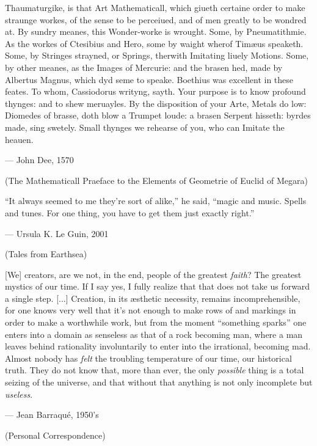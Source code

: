 
Thaumaturgike, is that Art Mathematicall, which giueth certaine order to make straunge workes, of the sense to be perceiued, and of men greatly to be wondred at. By sundry meanes, this Wonder-worke is wrought. Some, by Pneumatithmie. As the workes of Ctesibius and Hero, some by waight wherof Timæus speaketh. Some, by Stringes strayned, or Springs, therwith Imitating liuely Motions. Some, by other meanes, as the Images of Mercurie: and the brasen hed, made by Albertus Magnus, which dyd seme to speake. Boethius was excellent in these feates. To whom, Cassiodorus writyng, sayth. Your purpose is to know profound thynges: and to shew meruayles. By the disposition of your Arte, Metals do low: Diomedes of brasse, doth blow a Trumpet loude: a brasen Serpent hisseth: byrdes made, sing swetely. Small thynges we rehearse of you, who can Imitate the heauen.

\phantom{text} \hfill — John Dee, 1570

(The Mathematicall Praeface to the Elements of Geometrie of Euclid of Megara)

\vspace{2cm}

``It always seemed to me they’re sort of alike,'' he said, ``magic and music.
Spells and tunes. For one thing, you have to get them just exactly right.''

\phantom{text} \hfill — Ursula K. Le Guin, 2001

\phantom{text} \hfill (Tales from Earthsea)

\vspace{2cm}

[We] creators, are we not, in the end, people of the greatest \emph{faith}? The greatest mystics of our time. If I say yes, I fully realize that that does not take us forward a single step. [...] Creation, in its æsthetic necessity, remains incomprehensible, for one knows very well that it's not enough to make rows of  and  markings in order to make a worthwhile work, but from the moment ``something sparks'' one enters into a domain as senseless as that of a rock becoming man, where a man leaves behind rationality involuntarily to enter into the irrational, becoming mad. Almost nobody has \emph{felt} the troubling temperature of our time, our historical truth. They do not know that, more than ever, the only \emph{possible} thing is a total seizing of the universe, and that without that anything is not only incomplete but \emph{useless}.

\phantom{text} \hfill — Jean Barraqué, 1950's

\phantom{text} \hfill (Personal Correspondence)